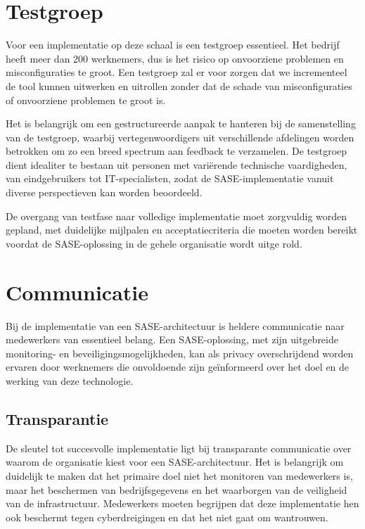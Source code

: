 \section{Testgroep}
Voor een implementatie op deze schaal is een testgroep essentieel. Het bedrijf heeft meer dan 200 werknemers, dus is het risico op onvoorziene problemen en misconfiguraties te groot. Een testgroep zal er voor zorgen dat we incrementeel de tool kunnen uitwerken en uitrollen zonder dat de schade van misconfiguraties of onvoorziene problemen te groot is.

\vspace{2ex}

Het is belangrijk om een gestructureerde aanpak te hanteren bij de samenstelling van de testgroep, waarbij vertegenwoordigers uit verschillende afdelingen worden betrokken om zo een breed spectrum aan feedback te verzamelen. De testgroep dient idealiter te bestaan uit personen met variërende technische vaardigheden, van eindgebruikers tot IT-specialisten, zodat de SASE-implementatie vanuit diverse perspectieven kan worden beoordeeld.

\vspace{2ex}

De overgang van testfase naar volledige implementatie moet zorgvuldig worden gepland, met duidelijke mijlpalen en acceptatiecriteria die moeten worden bereikt voordat de SASE-oplossing in de gehele organisatie wordt uitge rold.

\section{Communicatie}
Bij de implementatie van een SASE-architectuur is heldere communicatie naar medewerkers van essentieel belang. Een SASE-oplossing, met zijn uitgebreide monitoring- en beveiligingsmogelijkheden, kan als privacy overschrijdend worden ervaren door werknemers die onvoldoende zijn geïnformeerd over het doel en de werking van deze technologie.

\subsection{Transparantie}
De sleutel tot succesvolle implementatie ligt bij transparante communicatie over waarom de organisatie kiest voor een SASE-architectuur. Het is belangrijk om duidelijk te maken dat het primaire doel niet het monitoren van medewerkers is, maar het beschermen van bedrijfsgegevens en het waarborgen van de veiligheid van de infrastructuur. Medewerkers moeten begrijpen dat deze implementatie hen ook beschermt tegen cyberdreigingen en dat het niet gaat om wantrouwen.

